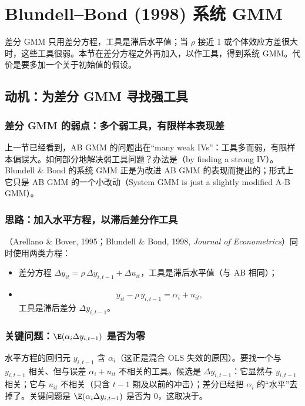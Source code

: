 \section{Blundell--Bond (1998) 系统 GMM}\label{sec:U12b-sys}

差分 GMM 只用差分方程，工具是滞后水平值；当 $\rho$ 接近 1 或个体效应方差很大时，这些工具很弱。本节在差分方程之外再加入，以作工具，得到系统 GMM。代价是要多加一个关于初始值的假设。

\subsection{动机：为差分 GMM 寻找强工具}

\subsubsection{差分 GMM 的弱点：多个弱工具，有限样本表现差}

上一节已经看到，AB GMM 的问题出在“many weak IVs”：工具多而弱，有限样本偏误大。如何部分地解决弱工具问题？办法是（by finding a strong IV）。Blundell \& Bond 的系统 GMM 正是为改进 AB GMM 的表现而提出的；形式上它只是 AB GMM 的一个小改动（System GMM is just a slightly modified A-B GMM）。

\subsubsection{思路：加入水平方程，以滞后差分作工具}

（Arellano \& Bover, 1995；Blundell \& Bond, 1998, \emph{Journal of Econometrics}）同时使用两类方程：
\begin{itemize}
  \item 差分方程 $\Delta y_{it}=\rho\,\Delta y_{i,t-1}+\Delta u_{it}$，工具是滞后水平值（与 AB 相同）；
  \item {}
  \[
  y_{it}-\rho\,y_{i,t-1}=\alpha_i+u_{it},
  \]
  工具是滞后差分 $\Delta y_{i,t-1}$。
\end{itemize}

\subsubsection{关键问题：\texorpdfstring{$\E(\alpha_i\Delta y_{i,t-1})$}{E(alpha Delta y)} 是否为零}

水平方程的回归元 $y_{i,t-1}$ 含 $\alpha_i$（这正是混合 OLS 失效的原因）。要找一个与 $y_{i,t-1}$ 相关、但与误差 $\alpha_i+u_{it}$ 不相关的工具。候选是 $\Delta y_{i,t-1}$：它显然与 $y_{i,t-1}$ 相关；它与 $u_{it}$ 不相关（只含 $t-1$ 期及以前的冲击）；差分已经把 $\alpha_i$ 的“水平”去掉了。关键问题是 $\E(\alpha_i\Delta y_{i,t-1})$ 是否为 $0$，这取决于。

